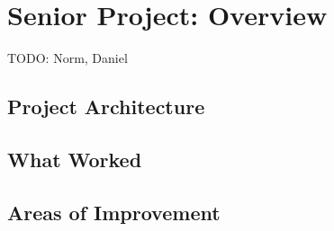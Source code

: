 \section{Senior Project: Overview}
TODO: Norm, Daniel
\subsection{Project Architecture}

\subsection{What Worked}

\subsection{Areas of Improvement}

\newpage